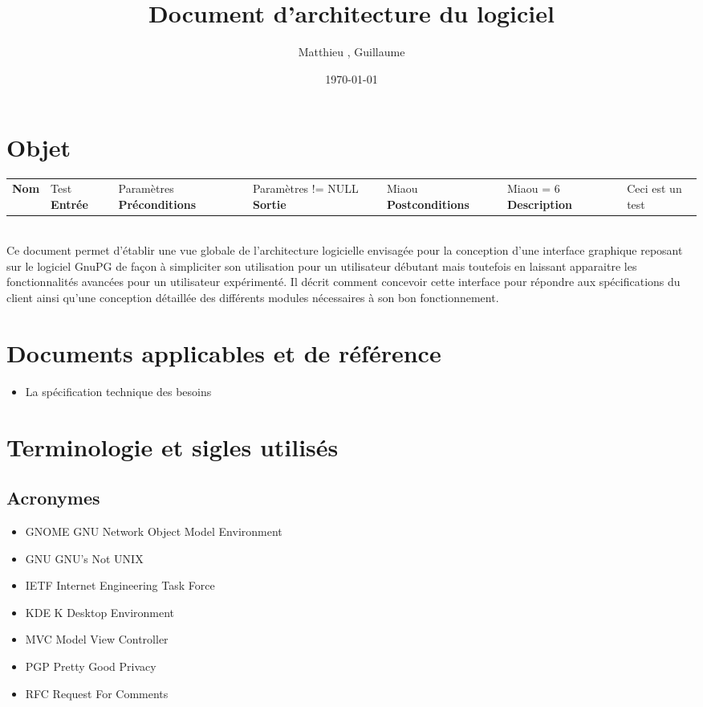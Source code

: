 \documentclass{../res/univ-projet}
\title{Document d'architecture du logiciel}
\author{Matthieu \bsc{Fin}, Guillaume \bsc{Leroy}}
\date{\today}
\newcommand{\methode}[6]{
  \begin{tabular}{|>{\centering}p{2.5cm}|>{\centering}p{7cm}|}
    \hline
    \color{white}\cellcolor{blue}\bfseries{Nom}&
    #1 \cr
    \hline
    \color{white}\cellcolor{blue}\bfseries{Entrée}&
    #2 \cr
    \hline
    \color{white}\cellcolor{blue}\bfseries{Préconditions}&
    #3 \cr
    \hline
    \color{white}\cellcolor{blue}\bfseries{Sortie}&
    #4 \cr
    \hline
    \color{white}\cellcolor{blue}\bfseries{Postconditions}&
    #5 \cr
    \hline
    \color{white}\cellcolor{blue}\bfseries{Description}&
    #6 \cr
    \hline
  \end{tabular}\\
}
\begin{document}
\maketitle
\newpage
\tableofcontents
\newpage

\section{Objet}
  \methode{Test}{Paramètres}{Paramètres != NULL}{Miaou}{Miaou = 6}{Ceci est un test}
  Ce document permet d'établir une vue globale de l'architecture logicielle envisagée pour la conception d'une interface graphique reposant sur le logiciel GnuPG de façon à simpliciter son utilisation pour un utilisateur débutant mais toutefois en laissant apparaitre les fonctionnalités avancées pour un utilisateur expérimenté. Il décrit comment concevoir cette interface pour répondre aux spécifications du client ainsi qu'une conception détaillée des différents modules nécessaires à son bon fonctionnement. 

\section{Documents applicables et de référence}
  \begin{itemize}
    \item La spécification technique des besoins
  \end{itemize}

\section{Terminologie et sigles utilisés}
  \subsection{Acronymes}
    \begin{itemize}
      \item GNOME GNU Network Object Model Environment
      \item GNU GNU's Not UNIX
      \item IETF Internet Engineering Task Force
      \item KDE K Desktop Environment
      \item MVC Model View Controller
      \item PGP Pretty Good Privacy
      \item RFC Request For Comments
    \end{itemize}
\end{document}
